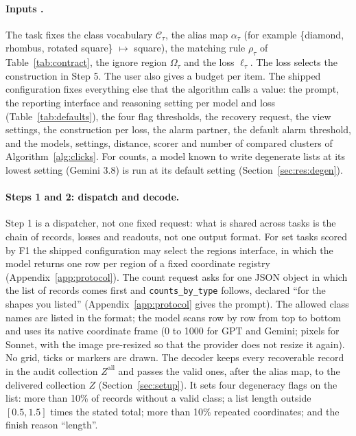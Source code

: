 \paragraph{Inputs .} The task fixes the class vocabulary $\mathcal{C}_\tau$, the alias map $\alpha_\tau$ (for example \{diamond, rhombus, rotated square\} $\mapsto$ square), the matching rule $\rho_\tau$ of Table~\ref{tab:contract}, the ignore region $\Omega_\tau$ and the loss $\ell_\tau$. The loss selects the construction in Step 5. The user also gives a budget per item. The shipped configuration fixes everything else that the algorithm calls a value: the prompt, the reporting interface and reasoning setting per model and loss (Table~\ref{tab:defaults}), the four flag thresholds, the recovery request, the view settings, the construction per loss, the alarm partner, the default alarm threshold, and the models, settings, distance, scorer and number of compared clusters of Algorithm~\ref{alg:clicks}. For counts, a model known to write degenerate lists at its lowest setting (Gemini 3.8) is run at its default setting (Section~\ref{sec:res:degen}).

\paragraph{Steps 1 and 2: dispatch and decode.} Step 1 is a dispatcher, not one fixed request: what is shared across tasks is the chain of records, losses and readouts, not one output format. For set tasks scored by F1 the shipped configuration may select the regions interface, in which the model returns one row per region of a fixed coordinate registry (Appendix~\ref{app:protocol}). The count request asks for one JSON object in which the list of records comes first and \texttt{counts\_by\_type} follows, declared ``for the shapes you listed'' (Appendix~\ref{app:protocol} gives the prompt). The allowed class names are listed in the format; the model scans row by row from top to bottom and uses its native coordinate frame (0 to 1000 for GPT and Gemini; pixels for Sonnet, with the image pre-resized so that the provider does not resize it again). No grid, ticks or markers are drawn. The decoder keeps every recoverable record in the audit collection $Z^{\mathrm{all}}$ and passes the valid ones, after the alias map, to the delivered collection $Z$ (Section~\ref{sec:setup}). It sets four degeneracy flags on the list: more than 10\% of records without a valid class; a list length outside $[0.5,1.5]$ times the stated total; more than 10\% repeated coordinates; and the finish reason ``length''.

